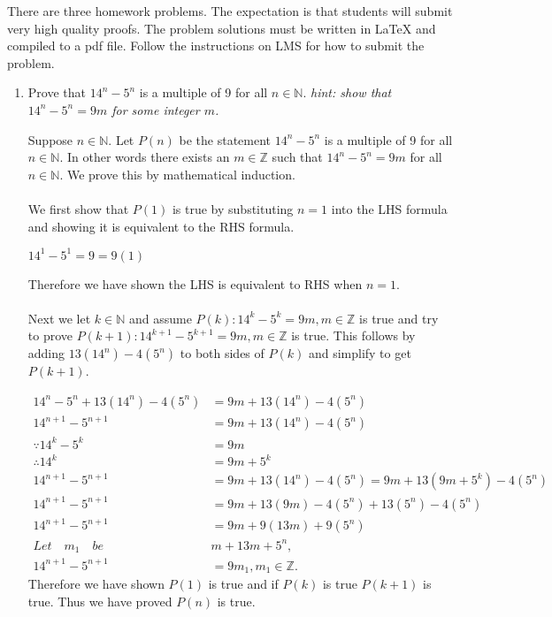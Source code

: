 \documentclass{article}
\begin{document}

There are three homework problems. The expectation is that students
will submit very high quality proofs. The problem solutions must be written
in LaTeX and compiled to a pdf file. 
Follow the instructions on LMS for how to submit the problem.

\bigskip
\bigskip


\begin{enumerate}

\item Prove that  $14^n - 5^n$ is a multiple of 9 for all $n \in \mathbb{N}$. {\it hint: show that $14^n - 5^n = 9 m$ for some integer $m$.}
\medskip
\vspace{.15in}

 Suppose $n \in \mathbb{N}$. Let $P(n)$ be the statement $14^n-5^n$ is a multiple of 9 for all $n \in \mathbb{N}$. In other words there exists an $m \in \mathbb{Z}$ such that $14^n-5^n = 9m$ for all $n \in \mathbb{N}$. We prove this by mathematical induction.\\\\
We first show that $P(1)$ is true by substituting $n = 1$ into the LHS formula and showing it is equivalent to the RHS formula.

\begin{center}
	$14^1 - 5^1 = 9 = 9(1)$
\end{center}  
Therefore we have shown the LHS is equivalent to RHS when $n = 1$.\\\\
Next we let $k \in \mathbb{N}$ and assume $P(k):14^k-5^k=9m,m \in \mathbb{Z}$ is true and try to prove $P(k+1):14^{k+1}-5^{k+1}=9m,m \in \mathbb{Z}$ is true. This follows by adding $13(14^n)-4(5^n)$ to both sides of $P(k)$ and simplify to get $P(k+1)$.

\begin{align*}
	14^n-5^n+13(14^n)-4(5^n) &= 9m+13(14^n)-4(5^n)\\
	14^{n+1}-5^{n+1}&=9m+13(14^n)-4(5^n)\\
	\because 14^{k}-5^{k}&=9m\\
	\therefore 14^k&=9m+5^k\\
	14^{n+1}-5^{n+1}&=9m+13(14^n)-4(5^n)=9m+13(9m+5^k)-4(5^n)\\
	14^{n+1}-5^{n+1}&=9m+13(9m)-4(5^n)+13(5^n)-4(5^n)\\
	14^{n+1}-5^{n+1}&=9m+9(13m)+9(5^n)\\
	Let \quad m_1 \quad be \quad &m+13m+5^n,\\
	14^{n+1}-5^{n+1} &= 9m_1,m_1 \in \mathbb{Z}.
\end{align*}
Therefore we have shown $P(1)$ is true and if $P(k)$ is true $P(k+1)$ is true. Thus we have proved $P(n)$ is true.


\end{enumerate}
\end{document}
